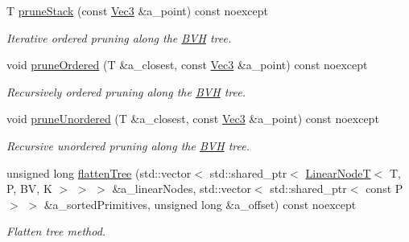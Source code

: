 \begin{DoxyCompactItemize}
T \hyperlink{classBVH_1_1NodeT_a6bd0a4dd5843f010dd579d59a289b4d8}{prune\+Stack} (const \hyperlink{classBVH_1_1NodeT_a6fbb4308c5c55ee170c5f992df7ae1d0}{Vec3} \&a\+\_\+point) const noexcept
\begin{DoxyCompactList}\small\item\em Iterative ordered pruning along the \hyperlink{namespaceBVH}{B\+VH} tree. \end{DoxyCompactList}\item 
void \hyperlink{classBVH_1_1NodeT_ac4a3be457d66d2673f717f203e60fc08}{prune\+Ordered} (T \&a\+\_\+closest, const \hyperlink{classBVH_1_1NodeT_a6fbb4308c5c55ee170c5f992df7ae1d0}{Vec3} \&a\+\_\+point) const noexcept
\begin{DoxyCompactList}\small\item\em Recursively ordered pruning along the \hyperlink{namespaceBVH}{B\+VH} tree. \end{DoxyCompactList}\item 
void \hyperlink{classBVH_1_1NodeT_ad252aa451ca983750dfa0c24344253b2}{prune\+Unordered} (T \&a\+\_\+closest, const \hyperlink{classBVH_1_1NodeT_a6fbb4308c5c55ee170c5f992df7ae1d0}{Vec3} \&a\+\_\+point) const noexcept
\begin{DoxyCompactList}\small\item\em Recursive unordered pruning along the \hyperlink{namespaceBVH}{B\+VH} tree. \end{DoxyCompactList}\item 
unsigned long \hyperlink{classBVH_1_1NodeT_aa01d6673b9e48735594b01bdcbefc63f}{flatten\+Tree} (std\+::vector$<$ std\+::shared\+\_\+ptr$<$ \hyperlink{classBVH_1_1LinearNodeT}{Linear\+NodeT}$<$ T, P, BV, K $>$ $>$ $>$ \&a\+\_\+linear\+Nodes, std\+::vector$<$ std\+::shared\+\_\+ptr$<$ const P $>$ $>$ \&a\+\_\+sorted\+Primitives, unsigned long \&a\+\_\+offset) const noexcept
\begin{DoxyCompactList}\small\item\em Flatten tree method. \end{DoxyCompactList}\end{DoxyCompactItemize}
